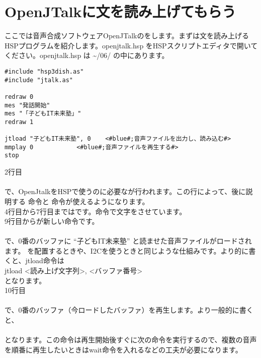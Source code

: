 \newpage
\section{OpenJTalkに文を読み上げてもらう}
ここでは音声合成ソフトウェアOpenJTalkのをします。まずは文を読み上げるHSPプログラムを紹介します。openjtalk.hsp をHSPスクリプトエディタで開いてください。openjtalk.hsp は  \textasciitilde /06/ の中にあります。\\

\begin{lstlisting}[caption=openjtalk.hsp,label=openjtalk.hsp]
#include "hsp3dish.as"
#include "jtalk.as"

redraw 0
mes "発話開始"
mes "「子どもIT未来塾」"
redraw 1

jtload "子どもIT未来塾", 0	<#blue#;音声ファイルを出力し、読み込む#>
mmplay 0			<#blue#;音声ファイルを再生する#>
stop
\end{lstlisting}

\noindent
2行目\\
\\
で、OpenJtalkをHSPで使うのに必要なが行われます。この行によって、後に説明する  命令と  命令が使えるようになります。\\
4行目から7行目まではです。命令で文字をさせています。\\
9行目からが新しい命令です。\\
\\
で、0番のバッファに “子どもIT未来塾” と読ませた音声ファイルがロードされます。 を配置するときや、I2Cを使うときと同じような仕組みです。より的に書くと、jtload命令は\\
jtload <読み上げ文字列>, <バッファ番号>\\
となります。\\
10行目\\
\\
で、0番のバッファ（今ロードしたバッファ）を再生します。より一般的に書くと、\\
\\
となります。この命令は再生開始後すぐに次の命令を実行するので、複数の音声を順番に再生したいときはwait命令を入れるなどの工夫が必要になります。\\

\begin{tcolorbox}[title=\useOmetoi]
\begin{enumerate}
\end{enumerate}
\end{tcolorbox}

